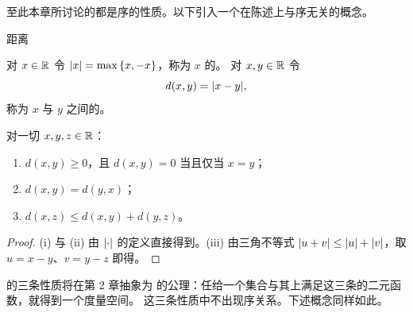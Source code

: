 至此本章所讨论的都是序的性质。以下引入一个在陈述上与序无关的概念。

\begin{concept}{距离}
\end{concept}

\begin{definition}[绝对值与距离]
  \label{def:metric-on-R}
  对 \(x \in \mathbb{R}\) 令 \(\lvert x\rvert = \max\left\{x, -x\right\}\)，称为 \(x\) 的。
  对 \(x, y \in \mathbb{R}\) 令
  \begin{equation}
    \label{eq:def-d}
    d(x, y) = \lvert x - y\rvert,
  \end{equation}
  称为 \(x\) 与 \(y\) 之间的。
\end{definition}

\begin{proposition}
  \label{prop:d-is-metric}
  对一切 \(x, y, z \in \mathbb{R}\)：
  \begin{enumerate}[label=(\roman*)]
    \item \(d(x,y) \ge 0\)，且 \(d(x,y) = 0\) 当且仅当 \(x = y\)；
    \item \(d(x,y) = d(y,x)\)；
    \item \(d(x,z) \le d(x,y) + d(y,z)\)。
  \end{enumerate}
\end{proposition}

\begin{proof}
  (i) 与 (ii) 由 \(\lvert\cdot\rvert\) 的定义直接得到。(iii) 由三角不等式
  \(\lvert u + v\rvert \le \lvert u\rvert + \lvert v\rvert\)，取 \(u = x - y\)、\(v = y - z\) 即得。
\end{proof}

\begin{remark}
   的三条性质将在第 2 章抽象为
  的公理：任给一个集合与其上满足这三条的二元函数，就得到一个度量空间。
  这三条性质中不出现序关系。下述概念同样如此。
\end{remark}

